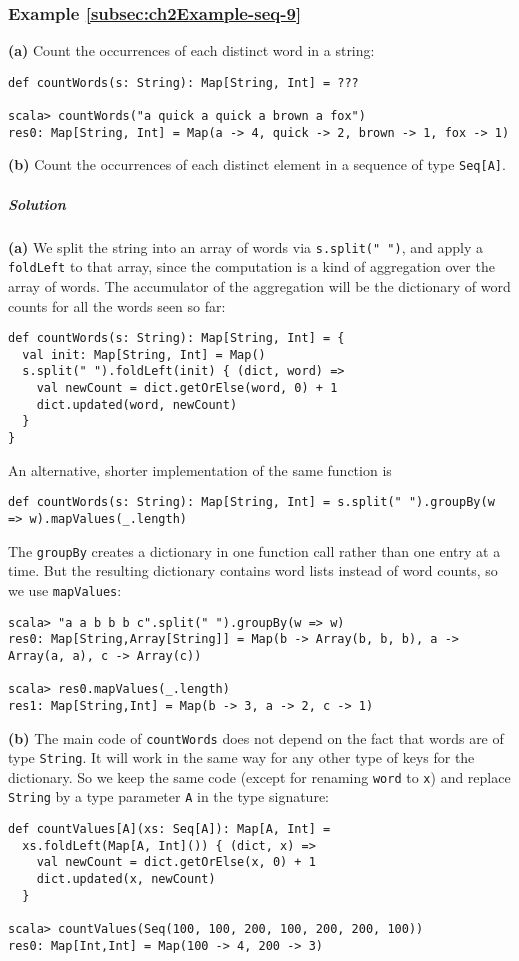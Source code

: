 \subsubsection{Example \label{subsec:ch2Example-seq-9}\ref{subsec:ch2Example-seq-9}}

\textbf{(a)} Count the occurrences of each distinct word in a string:
\begin{lstlisting}
def countWords(s: String): Map[String, Int] = ???

scala> countWords("a quick a quick a brown a fox")
res0: Map[String, Int] = Map(a -> 4, quick -> 2, brown -> 1, fox -> 1)
\end{lstlisting}
\textbf{(b)} Count the occurrences of each distinct element in a sequence
of type \lstinline!Seq[A]!.

\subparagraph{Solution}

\textbf{(a)} We split the string into an array of words via \lstinline!s.split(" ")!,
and apply a \lstinline!foldLeft! to that array, since the computation
is a kind of aggregation over the array of words. The accumulator
of the aggregation will be the dictionary of word counts for all the
words seen so far:
\begin{lstlisting}
def countWords(s: String): Map[String, Int] = {
  val init: Map[String, Int] = Map()
  s.split(" ").foldLeft(init) { (dict, word) =>
    val newCount = dict.getOrElse(word, 0) + 1
    dict.updated(word, newCount)
  }
}
\end{lstlisting}
An alternative, shorter implementation of the same function is
\begin{lstlisting}
def countWords(s: String): Map[String, Int] = s.split(" ").groupBy(w => w).mapValues(_.length)
\end{lstlisting}
The \lstinline!groupBy! creates a dictionary in one function call
rather than one entry at a time. But the resulting dictionary contains
word lists instead of word counts, so we use \lstinline!mapValues!:
\begin{lstlisting}
scala> "a a b b b c".split(" ").groupBy(w => w)
res0: Map[String,Array[String]] = Map(b -> Array(b, b, b), a -> Array(a, a), c -> Array(c))

scala> res0.mapValues(_.length)
res1: Map[String,Int] = Map(b -> 3, a -> 2, c -> 1)
\end{lstlisting}

\textbf{(b)} The main code of \lstinline!countWords! does not depend
on the fact that words are of type \lstinline!String!. It will work
in the same way for any other type of keys for the dictionary. So
we keep the same code (except for renaming \lstinline!word! to \lstinline!x!)
and replace \lstinline!String! by a type parameter \lstinline!A!
in the type signature:
\begin{lstlisting}
def countValues[A](xs: Seq[A]): Map[A, Int] =
  xs.foldLeft(Map[A, Int]()) { (dict, x) =>
    val newCount = dict.getOrElse(x, 0) + 1
    dict.updated(x, newCount)
  }

scala> countValues(Seq(100, 100, 200, 100, 200, 200, 100))
res0: Map[Int,Int] = Map(100 -> 4, 200 -> 3)
\end{lstlisting}


